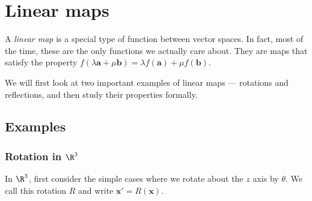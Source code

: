 \documentclass[a4paper]{article}
\begin{document}
\section{Linear maps}
A \emph{linear map} is a special type of function between vector spaces. In fact, most of the time, these are the only functions we actually care about. They are maps that satisfy the property $f(\lambda \mathbf{a} + \mu \mathbf{b}) = \lambda f(\mathbf{a}) + \mu f(\mathbf{b})$.

We will first look at two important examples of linear maps --- rotations and reflections, and then study their properties formally.
\subsection{Examples}
\subsubsection{Rotation in \texorpdfstring{$\R^3$}{R3}}
In $\R^3$, first consider the simple cases where we rotate about the $z$ axis by $\theta$. We call this rotation $R$ and write $\mathbf{x}' = R(\mathbf{x})$.
\end{document}

